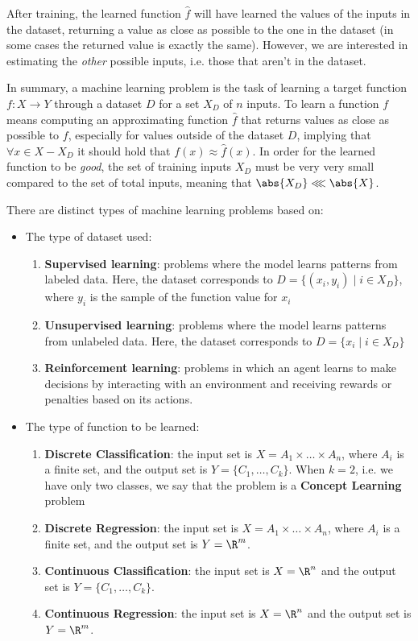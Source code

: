 \documentclass[a4paper, 12pt]{report}
\begin{document}
    After training, the learned function $\widehat{f}$ will have learned the values of the inputs in the dataset, returning a value as close as possible to the one in the dataset (in some cases the returned value is exactly the same). However, we are interested in estimating the \textit{other} possible inputs, i.e. those that aren't in the dataset.

    In summary, a machine learning problem is the task of learning a target function $f : X \to Y$ through a dataset $D$ for a set $X_D$ of $n$ inputs. To learn a function $f$ means computing an approximating function $\widehat{f}$ that returns values as close as possible to $f$, especially for values outside of the dataset $D$, implying that $\forall x \in X - X_D$ it should hold that $f(x) \approx \widehat{f}(x)$. In order for the learned function to be \textit{good}, the set of training inputs $X_D$ must be very very small compared to the set of total inputs, meaning that $\abs{X_D} \lll \abs{X}$.

    There are distinct types of machine learning problems based on:
    \begin{itemize}
        \item The type of dataset used:
        \begin{enumerate}
            \item \textbf{Supervised learning}: problems where the model learns patterns from labeled data. Here, the dataset corresponds to $D = \{(x_i,y_i) \mid i \in X_D\}$, where $y_i$ is the sample of the function value for $x_i$
            \item \textbf{Unsupervised learning}: problems where the model learns patterns from unlabeled data. Here, the dataset corresponds to $D = \{x_i \mid i \in X_D\}$
            \item \textbf{Reinforcement learning}: problems in which an agent learns to make decisions by interacting with an environment and receiving rewards or penalties based on its actions.
        \end{enumerate}

        \item The type of function to be learned:
        \begin{enumerate}
            \item \textbf{Discrete Classification}: the input set is $X = A_1 \times \ldots \times A_n$, where $A_i$ is a finite set, and the output set is $Y = \{C_1, \ldots, C_k\}$. When $k = 2$, i.e. we have only two classes, we say that the problem is a \textbf{Concept Learning} problem
            \item \textbf{Discrete Regression}: the input set is $X = A_1 \times \ldots \times A_n$, where $A_i$ is a finite set, and the output set is $Y = \R^m$.
            \item \textbf{Continuous Classification}: the input set is $X = \R^n$ and the output set is $Y = \{C_1, \ldots, C_k\}$.
            \item \textbf{Continuous Regression}: the input set is $X = \R^n$ and the output set is $Y = \R^m$.
        \end{enumerate}
    \end{itemize}
\end{document}
